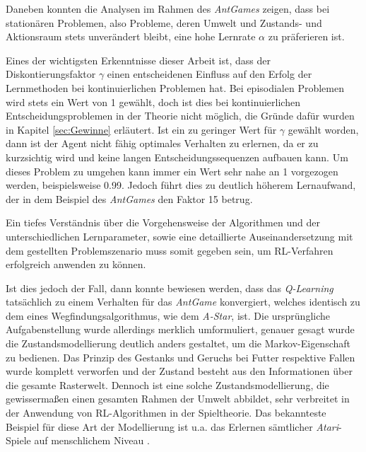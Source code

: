 \par 
Daneben konnten die Analysen im Rahmen des \textit{AntGames} zeigen, dass bei stationären Problemen, also Probleme, deren Umwelt und Zustands- und Aktionsraum stets unverändert bleibt, eine hohe Lernrate $\alpha$ zu präferieren ist.
\par 
Eines der wichtigsten Erkenntnisse dieser Arbeit ist, dass der Diskontierungsfaktor $\gamma$ einen entscheidenen Einfluss auf den Erfolg der Lernmethoden bei kontinuierlichen Problemen hat. Bei episodialen Problemen wird stets ein Wert von 1 gewählt, doch ist dies bei kontinuierlichen Entscheidungsproblemen in der Theorie nicht möglich, die Gründe dafür wurden in Kapitel \ref{sec:Gewinne} erläutert. Ist ein zu geringer Wert für $\gamma$ gewählt worden, dann ist der Agent nicht fähig optimales Verhalten zu erlernen, da er zu \glqq kurzsichtig\grqq{} wird und keine langen Entscheidungssequenzen aufbauen kann. Um dieses Problem zu umgehen kann immer ein Wert sehr nahe an 1 vorgezogen werden, beispielsweise 0.99. Jedoch führt dies zu deutlich höherem Lernaufwand, der in dem Beispiel des \textit{AntGames} den Faktor 15 betrug.
\par
Ein tiefes Verständnis über die Vorgehensweise der Algorithmen und der unterschiedlichen Lernparameter, sowie eine detaillierte Auseinandersetzung mit dem gestellten Problemszenario muss somit gegeben sein, um RL-Verfahren erfolgreich anwenden zu können.
\par 
Ist dies jedoch der Fall, dann konnte bewiesen werden, dass das \textit{Q-Learning} tatsächlich zu einem Verhalten für das \textit{AntGame} konvergiert, welches identisch zu dem eines Wegfindungsalgorithmus, wie dem \textit{A-Star}, ist. Die ursprüngliche Aufgabenstellung wurde allerdings merklich umformuliert, genauer gesagt wurde die Zustandsmodellierung deutlich anders gestaltet, um die Markov-Eigenschaft zu bedienen. Das Prinzip des Gestanks und Geruchs bei Futter respektive Fallen wurde komplett verworfen und der Zustand besteht aus  den Informationen über die gesamte Rasterwelt. Dennoch ist eine solche Zustandsmodellierung, die gewissermaßen einen gesamten Rahmen der Umwelt abbildet, sehr verbreitet in der Anwendung von RL-Algorithmen in der Spieltheorie. Das bekannteste Beispiel für diese Art der Modellierung ist u.a. das Erlernen sämtlicher \textit{Atari}-Spiele auf menschlichem Niveau \cite{dqn}.
\par 
